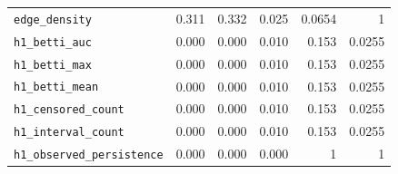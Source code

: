 \documentclass{article}
\begin{document}
\begin{table}[htbp]
\begin{tabular}{lrrrrr}
\verb|edge_density|            &            0.311 &             0.332 &        0.025 &    0.0654 &         1 \\
\rowcolor{orange!15}\verb|h1_betti_auc|            &            0.000 &             0.000 &        0.010 &     0.153 &    0.0255 \\
\rowcolor{orange!15}\verb|h1_betti_max|            &            0.000 &             0.000 &        0.010 &     0.153 &    0.0255 \\
\rowcolor{orange!15}\verb|h1_betti_mean|           &            0.000 &             0.000 &        0.010 &     0.153 &    0.0255 \\
\rowcolor{orange!15}\verb|h1_censored_count|       &            0.000 &             0.000 &        0.010 &     0.153 &    0.0255 \\
\rowcolor{orange!15}\verb|h1_interval_count|       &            0.000 &             0.000 &        0.010 &     0.153 &    0.0255 \\
\verb|h1_observed_persistence| &            0.000 &             0.000 &        0.000 &         1 &         1 \\
\bottomrule
\end{tabular}
\end{table}


\begin{table}[htbp]
\centering
\caption{Metrics of the pitch view that pass the independent pairwise FDR (Open Focus-Classical, 180s)}
\label{tab:pitch_rank_biserial}
\renewcommand{\arraystretch}{1.5}
\end{table}
\end{document}
